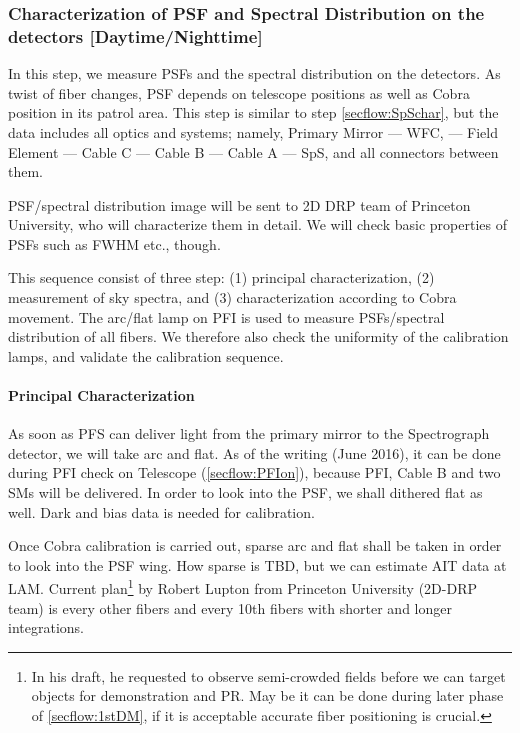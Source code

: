 \subsubsection{Characterization of PSF and Spectral Distribution on the detectors [Daytime/Nighttime]}\label{secflow:PSFchar}


In this step, we measure PSFs and the spectral distribution on the detectors.
As twist of fiber changes, PSF depends on telescope positions as well as Cobra position in its patrol area.
This step is similar to step \ref{secflow:SpSchar}, but the data includes all optics and systems; namely, Primary Mirror --- WFC, --- Field Element --- Cable C --- Cable B --- Cable A --- SpS, and all connectors between them.

PSF/spectral distribution image will be sent to 2D DRP team of Princeton University, who will characterize them in detail.
We will check basic properties of PSFs such as FWHM etc., though.

This sequence consist of three step: (1) principal characterization, (2) measurement of sky spectra, and (3) characterization according to Cobra movement.
The arc/flat lamp on PFI is used to measure PSFs/spectral distribution of all fibers.
We therefore also check the uniformity of the calibration lamps, and validate the calibration sequence.

\paragraph{Principal Characterization}
As soon as PFS can deliver light from the primary mirror to the Spectrograph detector, we will take arc and flat.
As of the writing (June 2016), it can be done during PFI check on Telescope (\ref{secflow:PFIon}), because PFI, Cable B and two SMs will be delivered.
In order to look into the PSF, we shall dithered flat as well.
Dark and bias data is needed for calibration.

Once Cobra calibration is carried out, sparse arc and flat shall be taken in order to look into the PSF wing.
How sparse is TBD, but we can estimate AIT data at LAM.
Current plan\footnote{In his draft, he requested to observe semi-crowded fields before we can target objects for demonstration and PR. May be it can be done during later phase of \ref{secflow:1stDM}, if it is acceptable accurate fiber positioning is crucial.} by Robert Lupton from Princeton University (2D-DRP team) is every other fibers and every 10th fibers with shorter and longer integrations.

